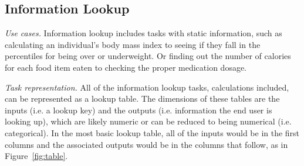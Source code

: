 \documentclass{sig-alternate}
\begin{document}



\subsection{Information Lookup}

\emph{Use cases.}
Information lookup includes tasks with static information, such as calculating an individual's body mass index to seeing if they fall in the percentiles for being over or underweight. Or finding out the number of calories for each food item eaten to checking the proper medication dosage.

\emph{Task representation.}
All of the information lookup tasks, calculations included, can be represented as a lookup table. 
The dimensions of these tables are the inputs (i.e. a lookup key) and the outputs (i.e. information the end user is looking up), which are likely numeric or can be reduced to being numerical (i.e. categorical). In the most basic lookup table, all of the inputs would be in the first columns and the associated outputs would be in the columns that follow, as in Figure~\ref{fig:table}.
\end{document}
